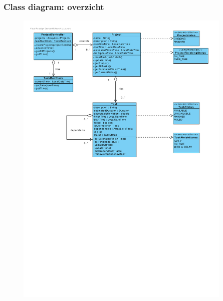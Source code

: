 \documentclass{beamer}
\begin{document}
%
%
%

\begin{frame}
\frametitle {Class diagram: overzicht}
\begin{figure}
\centering
\begin{center}
\includegraphics[width=0.92\textwidth]{figures/ClassDiagram.pdf}
\end{center}

\end{figure}
\end{frame}

%
%	
%
\end{document}
